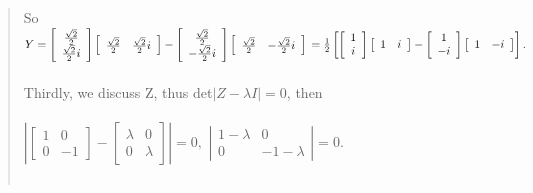 \documentclass[UTF8]{ctexart}
\begin{document}
\begin{quote}
	So $Y=\left[\begin{array}{c}{\frac{\sqrt{2}}{2}} \\ {\frac{\sqrt{2}}{2} i}\end{array}\right]\left[\begin{array}{cc}{\frac{\sqrt{2}}{2}} & {\frac{\sqrt{2}}{2} i}\end{array}\right]-\left[\begin{array}{c}{\frac{\sqrt{2}}{2}} \\ {-\frac{\sqrt{2}}{2} i}\end{array}\right]\left[\begin{array}{cc}{\frac{\sqrt{2}}{2}} & {-\frac{\sqrt{2}}{2} i}\end{array}\right]\\ \\=\frac{1}{2}\left[\left[\begin{array}{c}{1} \\ {i}\end{array}\right]\left[\begin{array}{cc}{1} & {i}\end{array}\right]-\left[\begin{array}{c}{1} \\ {-i}\end{array}\right]\left[\begin{array}{cc}{1} & {-i}\end{array}\right]\right].$ \\  \\
	Thirdly, we discuss Z, thus
	det$|Z-\lambda I |=0$, then\\  \\
	$\left |\begin{bmatrix}1&0\\0&-1\end{bmatrix}-\begin{bmatrix}\lambda&0\\0&\lambda\end{bmatrix}\right|=0,$
	$\left|\begin{array}{cccc}1-\lambda&0\\0&-1-\lambda \end{array}\right| =0. $ \\ \\


\end{quote}
\end{document}

